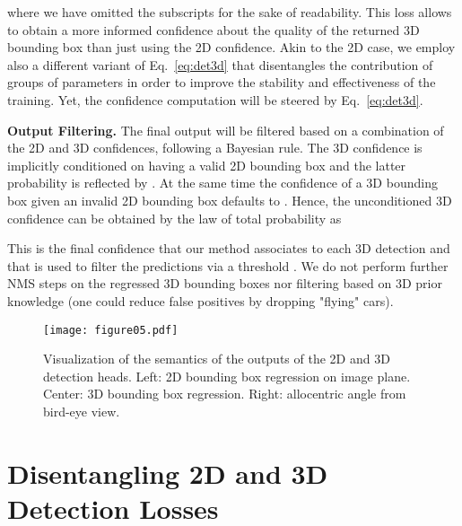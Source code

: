 \documentclass[10pt,twocolumn,letterpaper]{article}
\renewcommand{\paragraph}[1]{

        \vspace{3pt}
	\noindent\textbf{#1}}
\begin{document}
where we have omitted the subscripts for the sake of readability. This loss allows to obtain a more informed confidence about the quality of the returned 3D bounding box than just using the 2D confidence.
Akin to the 2D case, we employ also a different variant of Eq.~\eqref{eq:det3d} that disentangles the contribution of groups of parameters in order to improve the stability and effectiveness of the training. Yet, the confidence computation 
will be steered by Eq.~\eqref{eq:det3d}.


\paragraph{Output Filtering.}
The final output will be filtered based on a combination of the 2D and 3D confidences, following a Bayesian rule. The 3D confidence  is implicitly conditioned on having a valid 2D bounding box and the latter probability is reflected by . At the same time the confidence of a 3D bounding box given an invalid 2D bounding box defaults to . Hence, the unconditioned 3D confidence can be obtained by the law of total probability as

This is the final confidence that our method associates to each 3D detection and that is used to filter the predictions via a threshold .
We do not perform further NMS steps on the regressed 3D bounding boxes nor filtering based on 3D prior knowledge (\eg one could reduce false positives by dropping "flying" cars).


\begin{figure}
    \centering
    \texttt{[image: figure05.pdf]}
    \caption{Visualization of the semantics of the outputs of the 2D and 3D detection heads. Left: 2D bounding box regression on image plane. Center: 3D bounding box regression. Right: allocentric angle from bird-eye view. }
    \label{fig:notation}
    \vspace{-12pt}
\end{figure}

\section{Disentangling 2D and 3D Detection Losses}\label{sec:disentangling}
\end{document}
